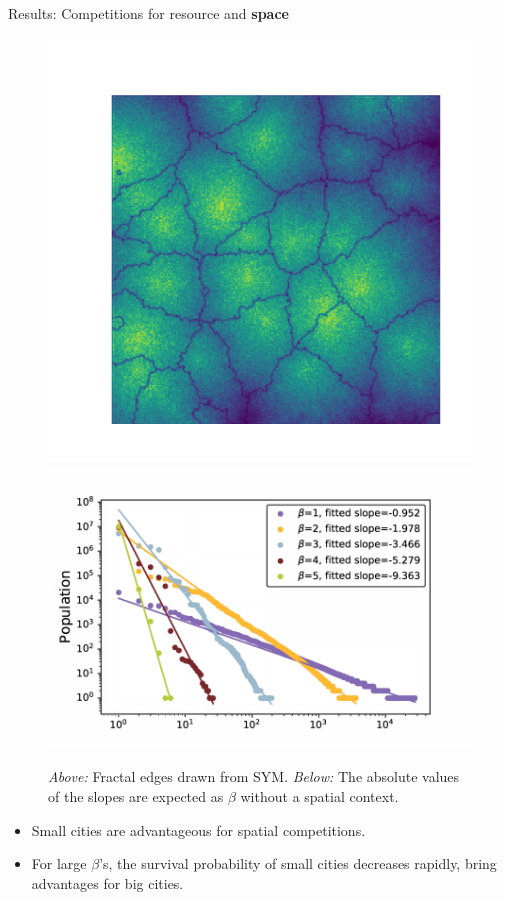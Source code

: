 \begin{frame}{Results: Competitions for resource and \textbf{space}}
\begin{minipage}{0.6\linewidth}
\begin{figure}
    \centering
        \includegraphics[width = 0.6\linewidth]{Pics/fractal_41_256.pdf}
        \includegraphics[width = 0.6\linewidth]{Pics/zipf.pdf}
        \caption{\textit{Above:} Fractal edges drawn from SYM. \textit{Below:} The absolute values of the slopes are expected as $\beta$ without a spatial context.}
    
    \label{fig:my_label}
\end{figure}
\end{minipage}
\begin{minipage}{0.38\linewidth}
\begin{itemize}
    \item Small cities are advantageous for spatial competitions.
    \item For large $\beta$'s, the survival probability of small cities decreases rapidly, bring advantages for big cities.
\end{itemize}
\end{minipage}

\end{frame}

